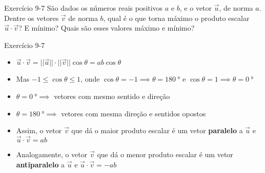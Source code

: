 \begin{frame}[c]{Exercício 9-7}
    São dados os números reais positivos \(a\) e \(b\), e o vetor \(\vec{u}\), de norma \(a\).
    Dentre os vetores \(\vec{v}\) de norma \(b\), qual é o que torna máximo o produto escalar \(\vec{u}\cdot\vec{v}\)?
    E mínimo? Quais são esses valores máximo e mínimo?
\end{frame}

\begin{frame}{Exercício 9-7}
    \begin{itemize}
        \item \(
            \vec{u}\cdot\vec{v}=||\vec{u}||\cdot ||\vec{v}||\cos{\theta}=
            ab\cos{\theta}
            \)
        \item Mas \(-1 \leq \cos{\theta} \leq 1\), onde \(
            \cos{\theta}=-1 \implies\theta=\SI{180}{\degree}\) e \(
            \cos{\theta}=1 \implies\theta=\SI{0}{\degree}\)
        \item \(\theta=\SI{0}{\degree} \implies \) vetores com mesmo sentido e direção
        \item \(\theta=\SI{180}{\degree} \implies \) vetores com mesma direção e sentidos opostos
        \item Assim, o vetor \(\vec{v}\) que dá o maior produto escalar é um vetor \textbf{paralelo} a \(\vec{u}\)
            e \( \vec{u}\cdot\vec{v}=ab\)

        \item Analogamente, o vetor \(\vec{v}\) que dá o menor produto escalar é um vetor \textbf{antiparalelo} a \(\vec{u}\)
            e \( \vec{u}\cdot\vec{v}=-ab\)
    \end{itemize}

\end{frame}

